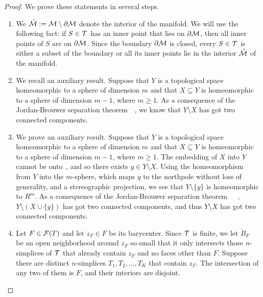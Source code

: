 \documentclass[12pt,a4paper]{article}
\begin{document}
\begin{proof}
    We prove these statements in several steps.
    \begin{enumerate}
    \item 
    We $\mathring {{\mathcal M}} := {\mathcal M} \setminus \partial {\mathcal M}$ denote the interior of the manifold. 
    We will use the following fact: if $S \in {\mathcal T}$ has an inner point that lies on $\partial {\mathcal M}$, then all inner points of $S$ are on $\partial {\mathcal M}$. 
    Since the boundary $\partial {\mathcal M}$ is closed, every $S \in {\mathcal T}$ is either a subset of the boundary or all its inner points lie in the interior $\mathring {{\mathcal M}}$ of the manifold. 
    
    \item 
    We recall an auxiliary result.
    Suppose that $Y$ is a topological space homeomorphic to a sphere of dimension $m$ and that $X \subseteq Y$ is homeomorphic to a sphere of dimension $m-1$, where $m \geq 1$. 
    As a consequence of the Jordan-Brouwer separation theorem~\cite[Corollary 5.24]{mayer1989algebraische}~\cite[Corollary 6.4]{massey1981algebraic}, 
    we know that $Y \setminus X$ has got two connected components.
    
    \item 
    We prove an auxiliary result. 
    Suppose that $Y$ is a topological space homeomorphic to a sphere of dimension $m$ and that $X \subseteq Y$ is homeomorphic to a sphere of dimension $m-1$, where $m \geq 1$. 
    The embedding of $X$ into $Y$ cannot be onto~\cite[Theorem~2.55]{lee2011topological}, and so there exists $y \in Y \setminus X$. 
    Using the homeomorphism from $Y$ into the $m$-sphere, which maps $y$ to the northpole without loss of generality, and a stereographic projection, 
    we see that $Y \setminus \{y\}$ is homeomorphic to $R^{m}$.
    As a consequence of the Jordan-Brouwer separation theorem~\cite[Theorem 5.23]{mayer1989algebraische}~\cite[Corollary 5.24]{mayer1989algebraische}~\cite[Corollary 6.4]{massey1981algebraic}, $Y \setminus (X \cup \{y\})$ has got two connected components,
    and thus $Y \setminus X$ has got two connected components.
    
    \item
    Let $F \in {\mathcal F}(T)$ and let $z_F \in F$ be its barycenter. 
    Since ${\mathcal T}$ is finite, we let $\mathring B_F$ be an open neighborhood around $z_F$ so small that it only intersects those $n$-simplices of ${\mathcal T}$ that already contain $z_F$ and no faces other than $F$.
    Suppose there are distinct $n$-simplices $T_1, T_2, \dots, T_K$ that contain $z_F$. 
    The intersection of any two of them is $F$, and their interiors are disjoint. 
    

\end{enumerate}
\end{proof}
\end{document}

